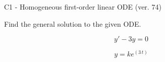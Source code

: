 \begin{exercise}
  \begin{exerciseTitle}C1 - Homogeneous first-order linear ODE (ver. 74)\end{exerciseTitle}
  \begin{exerciseStatement}
    
Find the general solution to the given ODE.

    
\[y'-3y=0\]

  \end{exerciseStatement}
  \begin{exerciseAnswer}
    
\[y= k e^{\left(3 \, t\right)}\]

  \end{exerciseAnswer}
\end{exercise}